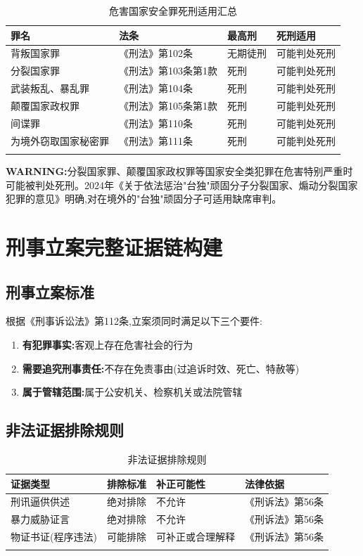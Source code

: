 \documentclass[12pt,a4paper]{article}
\begin{document}
\begin{longtable}{p{3cm}p{4cm}p{3cm}p{3cm}}
  \toprule
  \textbf{罪名} & \textbf{法条} & \textbf{最高刑} & \textbf{死刑适用} \\
  \midrule
  背叛国家罪 & 《刑法》第102条 & 无期徒刑 & 可能判处死刑 \\
  分裂国家罪 & 《刑法》第103条第1款 & 死刑 & 可能判处死刑 \\
  武装叛乱、暴乱罪 & 《刑法》第104条 & 死刑 & 可能判处死刑 \\
  颠覆国家政权罪 & 《刑法》第105条第1款 & 死刑 & 可能判处死刑 \\
  间谍罪 & 《刑法》第110条 & 死刑 & 可能判处死刑 \\
  为境外窃取国家秘密罪 & 《刑法》第111条 & 死刑 & 可能判处死刑 \\
  \bottomrule
  \caption{危害国家安全罪死刑适用汇总}
\end{longtable}

\textbf{WARNING:}分裂国家罪、颠覆国家政权罪等国家安全类犯罪在危害特别严重时可能被判处死刑。2024年《关于依法惩治"台独"顽固分子分裂国家、煽动分裂国家犯罪的意见》明确,对在境外的"台独"顽固分子可适用缺席审判。

\clearpage

\section{刑事立案完整证据链构建}

\subsection{刑事立案标准}

根据《刑事诉讼法》第112条,立案须同时满足以下三个要件:

\begin{enumerate}
  \item \textbf{有犯罪事实:}客观上存在危害社会的行为
  \item \textbf{需要追究刑事责任:}不存在免责事由(过追诉时效、死亡、特赦等)
  \item \textbf{属于管辖范围:}属于公安机关、检察机关或法院管辖
\end{enumerate}

\subsection{非法证据排除规则}

\begin{longtable}{p{3cm}p{4cm}p{4cm}p{2cm}}
  \toprule
  \textbf{证据类型} & \textbf{排除标准} & \textbf{补正可能性} & \textbf{法律依据} \\
  \midrule
  刑讯逼供供述 & 绝对排除 & 不允许 & 《刑诉法》第56条 \\
  暴力威胁证言 & 绝对排除 & 不允许 & 《刑诉法》第56条 \\
  物证书证(程序违法) & 可能排除 & 可补正或合理解释 & 《刑诉法》第56条 \\
  \bottomrule
  \caption{非法证据排除规则}
\end{longtable}
\end{document}
